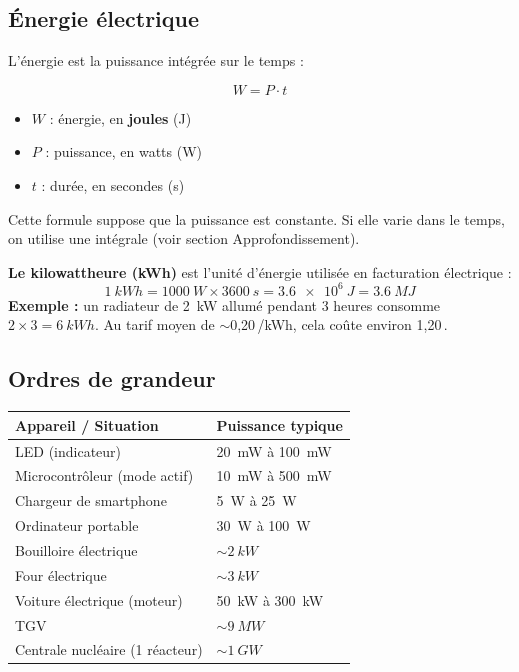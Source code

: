 \documentclass[12pt,a4paper,twoside]{book}
\begin{document}
\subsection{Énergie électrique}

L'énergie est la puissance intégrée sur le temps :

\begin{formule}
\[
\boxed{W = P \cdot t}
\]
\begin{itemize}[nosep]
\item $W$ : énergie, en \textbf{joules} (J)
\item $P$ : puissance, en watts (W)
\item $t$ : durée, en secondes (s)
\end{itemize}
\vspace{0.2cm}
Cette formule suppose que la puissance est constante. Si elle varie dans le temps, on utilise une intégrale (voir section Approfondissement).
\end{formule}

\begin{pratique}
\textbf{Le kilowattheure (kWh)} est l'unité d'énergie utilisée en facturation électrique :
\[
\SI{1}{kWh} = \SI{1000}{W} \times \SI{3600}{s} = \SI{3.6e6}{J} = \SI{3.6}{MJ}
\]
\textbf{Exemple :} un radiateur de \SI{2}{kW} allumé pendant 3 heures consomme $2 \times 3 = \SI{6}{kWh}$. Au tarif moyen de $\sim$0,20\,\texteuro/kWh, cela co\^ute environ 1,20\,\texteuro.
\end{pratique}

\subsection{Ordres de grandeur}

\begin{center}
\begin{tabular}{ll}
\toprule
\textbf{Appareil / Situation} & \textbf{Puissance typique} \\
\midrule
LED (indicateur) & \SI{20}{mW} à \SI{100}{mW} \\
Microcontrôleur (mode actif) & \SI{10}{mW} à \SI{500}{mW} \\
Chargeur de smartphone & \SI{5}{W} à \SI{25}{W} \\
Ordinateur portable & \SI{30}{W} à \SI{100}{W} \\
Bouilloire électrique & $\sim \SI{2}{kW}$ \\
Four électrique & $\sim \SI{3}{kW}$ \\
Voiture électrique (moteur) & \SI{50}{kW} à \SI{300}{kW} \\
TGV & $\sim \SI{9}{MW}$ \\
Centrale nucléaire (1 réacteur) & $\sim \SI{1}{GW}$ \\
\bottomrule
\end{tabular}
\end{center}
\end{document}
